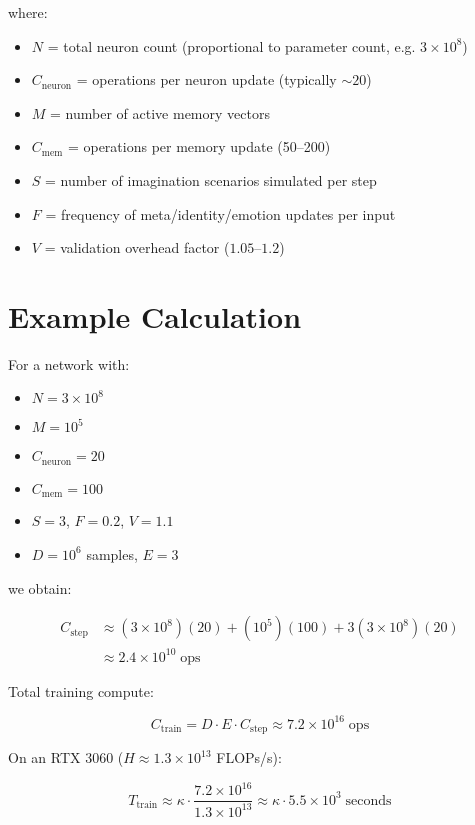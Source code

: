 \documentclass{article}
\begin{document}
where:
\begin{itemize}
    \item $N$ = total neuron count (proportional to parameter count, e.g. $3 \times 10^8$)
    \item $C_{\text{neuron}}$ = operations per neuron update (typically $\sim 20$)
    \item $M$ = number of active memory vectors
    \item $C_{\text{mem}}$ = operations per memory update (50–200)
    \item $S$ = number of imagination scenarios simulated per step
    \item $F$ = frequency of meta/identity/emotion updates per input
    \item $V$ = validation overhead factor ($1.05$–$1.2$)
\end{itemize}

\section{Example Calculation}
For a network with:
\begin{itemize}
    \item $N = 3 \times 10^8$
    \item $M = 10^5$
    \item $C_{\text{neuron}} = 20$
    \item $C_{\text{mem}} = 100$
    \item $S = 3$, $F = 0.2$, $V = 1.1$
    \item $D = 10^6$ samples, $E = 3$
\end{itemize}

we obtain:

\begin{align}
C_{\text{step}} &\approx (3 \times 10^8)(20) + (10^5)(100) + 3(3 \times 10^8)(20) \\
&\approx 2.4 \times 10^{10} \;\text{ops}
\end{align}

Total training compute:

\begin{equation}
C_{\text{train}} = D \cdot E \cdot C_{\text{step}} \approx 7.2 \times 10^{16} \;\text{ops}
\end{equation}

On an RTX 3060 ($H \approx 1.3 \times 10^{13}$ FLOPs/s):

\begin{equation}
T_{\text{train}} \approx \kappa \cdot \frac{7.2 \times 10^{16}}{1.3 \times 10^{13}} 
\approx \kappa \cdot 5.5 \times 10^3 \;\text{seconds}
\end{equation}
\end{document}
